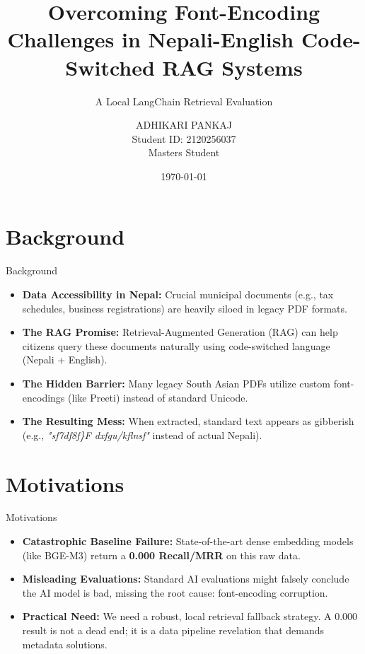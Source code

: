 \documentclass[11pt,aspectratio=169]{beamer}
\title[Code-Switched RAG for Nepali PDFs]{Overcoming Font-Encoding Challenges in Nepali-English Code-Switched RAG Systems}
\subtitle{A Local LangChain Retrieval Evaluation}
\author[Adhikari Pankaj]{ADHIKARI PANKAJ \\ \vspace{0.2cm} \small Student ID: 2120256037 \\ Masters Student}
\institute[Nankai University]{Nankai University}
\date{\today}
\begin{document}
\begin{frame}
    \titlepage
\end{frame}

\section{Background}
\begin{frame}{Background}
    \begin{itemize}
        \item \textbf{Data Accessibility in Nepal:} Crucial municipal documents (e.g., tax schedules, business registrations) are heavily siloed in legacy PDF formats.
        \item \textbf{The RAG Promise:} Retrieval-Augmented Generation (RAG) can help citizens query these documents naturally using code-switched language (Nepali + English).
        \item \textbf{The Hidden Barrier:} Many legacy South Asian PDFs utilize custom font-encodings (like Preeti) instead of standard Unicode. 
        \item \textbf{The Resulting Mess:} When extracted, standard text appears as gibberish (e.g., \textit{"sf7df8f\}F dxfgu/kflnsf"} instead of actual Nepali).
    \end{itemize}
\end{frame}

\section{Motivations}
\begin{frame}{Motivations}
    \begin{itemize}
        \item \textbf{Catastrophic Baseline Failure:} State-of-the-art dense embedding models (like BGE-M3) return a \textbf{0.000 Recall/MRR} on this raw data.
        \item \textbf{Misleading Evaluations:} Standard AI evaluations might falsely conclude the AI model is bad, missing the root cause: font-encoding corruption.
        \item \textbf{Practical Need:} We need a robust, local retrieval fallback strategy. A 0.000 result is not a dead end; it is a data pipeline revelation that demands metadata solutions.
    \end{itemize}
\end{frame}

\end{document}
